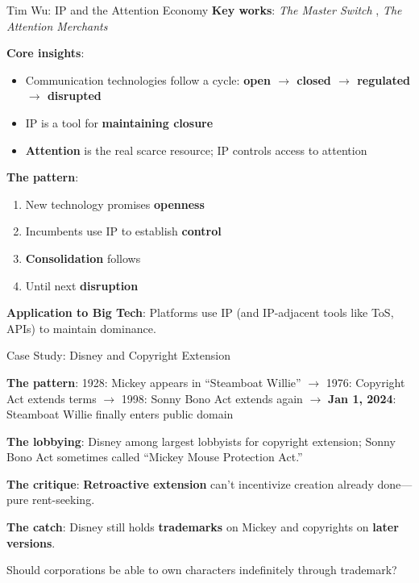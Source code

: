 ﻿\documentclass[aspectratio=169,11pt]{beamer}
\begin{document}
\begin{frame}{Tim Wu: IP and the Attention Economy}
\textbf{Key works}: \textit{The Master Switch} \parencite{wu_master_switch}, \textit{The Attention Merchants} \parencite{wu_attention_merchants}

\vspace{0.2cm}
\textbf{Core insights}:
\begin{itemize}
    \item Communication technologies follow a cycle: \textbf{open $\rightarrow$ closed $\rightarrow$ regulated $\rightarrow$ disrupted}
    \item IP is a tool for \textbf{maintaining closure}
    \item \textbf{Attention} is the real scarce resource; IP controls access to attention
\end{itemize}

\vspace{0.3cm}
\textbf{The pattern}:
\begin{enumerate}
    \item New technology promises \textbf{openness}
    \item Incumbents use IP to establish \textbf{control}
    \item \textbf{Consolidation} follows
    \item Until next \textbf{disruption}
\end{enumerate}

\vspace{0.2cm}
\textbf{Application to Big Tech}: Platforms use IP (and IP-adjacent tools like ToS, APIs) to maintain dominance.
\end{frame}

\begin{frame}{Case Study: Disney and Copyright Extension}
\begin{casestudybox}
\textbf{The pattern}: 1928: Mickey appears in ``Steamboat Willie'' $\rightarrow$ 1976: Copyright Act extends terms $\rightarrow$ 1998: Sonny Bono Act extends again $\rightarrow$ \textbf{Jan 1, 2024}: Steamboat Willie finally enters public domain
\end{casestudybox}

\vspace{0.2cm}
\textbf{The lobbying}: Disney among largest lobbyists for copyright extension; Sonny Bono Act sometimes called ``Mickey Mouse Protection Act.''

\vspace{0.1cm}
\textbf{The critique}: \textbf{Retroactive extension} can't incentivize creation already done---pure rent-seeking.

\vspace{0.1cm}
\textbf{The catch}: Disney still holds \textbf{trademarks} on Mickey and copyrights on \textbf{later versions}.

\begin{discussionbox}[Discussion]
Should corporations be able to own characters indefinitely through trademark?
\end{discussionbox}
\end{frame}
\end{document}
